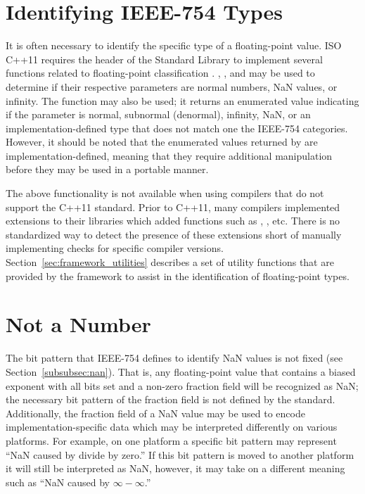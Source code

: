 \section{Identifying IEEE-754 Types}
\label{sec:challenges_identifying_types}
It is often necessary to identify the specific type of a floating-point value. ISO C++11 requires the  header of the Standard Library to implement several functions related to floating-point classification \cite{ISO-C++11}. , , and  may be used to determine if their respective parameters are normal numbers, NaN values, or infinity. The function  may also be used; it returns an enumerated value indicating if the parameter is normal, subnormal (denormal), infinity, NaN, or an implementation-defined type that does not match one the IEEE-754 categories. However, it should be noted that the enumerated values returned by  are implementation-defined, meaning that they require additional manipulation before they may be used in a portable manner.

The above functionality is not available when using compilers that do not support the C++11 standard. Prior to C++11, many compilers implemented extensions to their libraries which added functions such as , , etc. There is no standardized way to detect the presence of these extensions short of manually implementing checks for specific compiler versions. Section~\ref{sec:framework_utilities} describes a set of utility functions that are provided by the framework to assist in the identification of floating-point types.

\section{Not a Number}
\label{sec:challenges_special values}
The bit pattern that IEEE-754 defines to identify NaN values is not fixed (see Section~\ref{subsubsec:nan}). That is, any floating-point value that contains a biased exponent with all bits set and a non-zero fraction field will be recognized as NaN; the necessary bit pattern of the fraction field is not defined by the standard. Additionally, the fraction field of a NaN value may be used to encode implementation-specific data  which may be interpreted differently on various platforms. For example, on one platform a specific bit pattern may represent ``NaN caused by divide by zero.'' If this bit pattern is moved to another platform it will still be interpreted as NaN, however, it may take on a different meaning such as ``NaN caused by $\infty - \infty$.''

